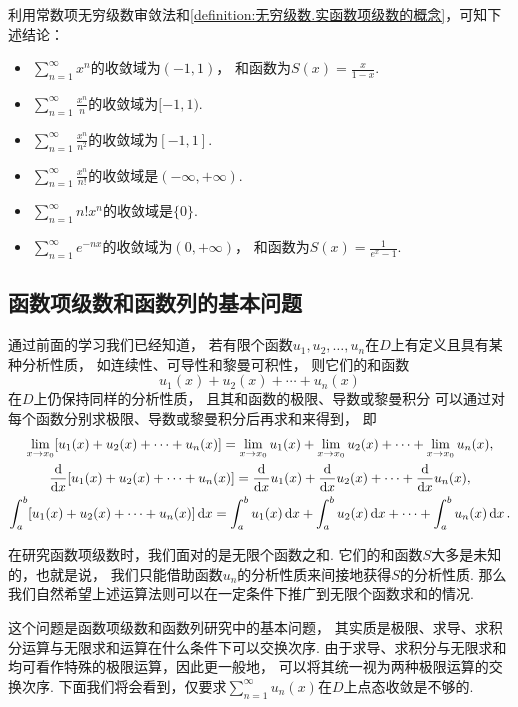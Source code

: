 \begin{example}
利用常数项无穷级数审敛法和\cref{definition:无穷级数.实函数项级数的概念}，可知下述结论：
\begin{itemize}
	\item \(\sum_{n=1}^\infty x^n\)的收敛域为\((-1,1)\)，
	和函数为\(S(x) = \frac{x}{1-x}\).
	\item \(\sum_{n=1}^\infty \frac{x^n}{n}\)的收敛域为\([-1,1)\).
	\item \(\sum_{n=1}^\infty \frac{x^n}{n^2}\)的收敛域为\([-1,1]\).
	\item \(\sum_{n=1}^\infty \frac{x^n}{n!}\)的收敛域是\((-\infty,+\infty)\).
	\item \(\sum_{n=1}^\infty n! x^n\)的收敛域是\(\{0\}\).
	\item \(\sum_{n=1}^\infty e^{-nx}\)的收敛域为\((0,+\infty)\)，
	和函数为\(S(x) = \frac1{e^x-1}\).
\end{itemize}
\end{example}

\subsection{函数项级数和函数列的基本问题}
通过前面的学习我们已经知道，
若有限个函数\(u_1,u_2,\dotsc,u_n\)在\(D\)上有定义且具有某种分析性质，
如连续性、可导性和黎曼可积性，
则它们的和函数\[
	u_1(x) + u_2(x) + \dotsb + u_n(x)
\]在\(D\)上仍保持同样的分析性质，
且其和函数的极限、导数或黎曼积分
可以通过对每个函数分别求极限、导数或黎曼积分后再求和来得到，
即\begin{gather*}
	\lim_{x \to x_0} [u_1(x) + u_2(x) + \dotsb + u_n(x)]
	= \lim_{x \to x_0} u_1(x)
	+ \lim_{x \to x_0} u_2(x)
	+ \dotsb
	+ \lim_{x \to x_0} u_n(x), \\
	\dv{x} [u_1(x) + u_2(x) + \dotsb + u_n(x)]
	= \dv{x} u_1(x)
	+ \dv{x} u_2(x)
	+ \dotsb
	+ \dv{x} u_n(x), \\
	\int_a^b [u_1(x) + u_2(x) + \dotsb + u_n(x)] \dd{x}
	= \int_a^b u_1(x) \dd{x}
	+ \int_a^b u_2(x) \dd{x}
	+ \dotsb
	+ \int_a^b u_n(x) \dd{x}.
\end{gather*}

在研究函数项级数时，我们面对的是无限个函数之和.
它们的和函数\(S\)大多是未知的，也就是说，
我们只能借助函数\(u_n\)的分析性质来间接地获得\(S\)的分析性质.
那么我们自然希望上述运算法则可以在一定条件下推广到无限个函数求和的情况.

这个问题是函数项级数和函数列研究中的基本问题，
其实质是极限、求导、求积分运算与无限求和运算在什么条件下可以交换次序.
由于求导、求积分与无限求和均可看作特殊的极限运算，因此更一般地，
可以将其统一视为两种极限运算的交换次序.
下面我们将会看到，仅要求\(\sum_{n=1}^\infty u_n(x)\)在\(D\)上点态收敛是不够的.

